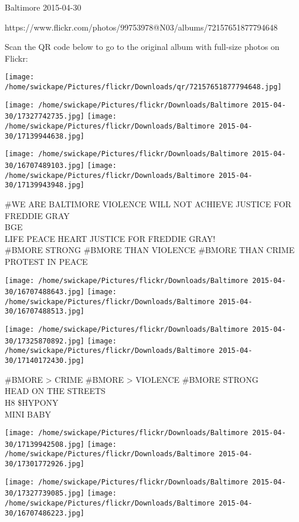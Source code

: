 \documentclass[10pt,letterpaper]{article}
\begin{document}
Baltimore 2015-04-30

https://www.flickr.com/photos/99753978@N03/albums/72157651877794648

Scan the QR code below to go to the original album with full-size photos on Flickr:

\texttt{[image: /home/swickape/Pictures/flickr/Downloads/qr/72157651877794648.jpg]}
\pagebreak

\texttt{[image: /home/swickape/Pictures/flickr/Downloads/Baltimore 2015-04-30/17327742735.jpg]}
\texttt{[image: /home/swickape/Pictures/flickr/Downloads/Baltimore 2015-04-30/17139944638.jpg]}

\texttt{[image: /home/swickape/Pictures/flickr/Downloads/Baltimore 2015-04-30/16707489103.jpg]}
\texttt{[image: /home/swickape/Pictures/flickr/Downloads/Baltimore 2015-04-30/17139943948.jpg]}

\#WE ARE BALTIMORE VIOLENCE WILL NOT ACHIEVE JUSTICE FOR FREDDIE GRAY\\
BGE\\
LIFE PEACE HEART JUSTICE FOR FREDDIE GRAY!\\
\#BMORE STRONG \#BMORE THAN VIOLENCE \#BMORE THAN CRIME PROTEST IN PEACE
\pagebreak

\texttt{[image: /home/swickape/Pictures/flickr/Downloads/Baltimore 2015-04-30/16707488643.jpg]}
\texttt{[image: /home/swickape/Pictures/flickr/Downloads/Baltimore 2015-04-30/16707488513.jpg]}

\texttt{[image: /home/swickape/Pictures/flickr/Downloads/Baltimore 2015-04-30/17325870892.jpg]}
\texttt{[image: /home/swickape/Pictures/flickr/Downloads/Baltimore 2015-04-30/17140172430.jpg]}

\#BMORE > CRIME \#BMORE > VIOLENCE \#BMORE STRONG\\
HEAD ON THE STREETS\\
H8 \$HYPONY\\
MINI BABY
\pagebreak

\texttt{[image: /home/swickape/Pictures/flickr/Downloads/Baltimore 2015-04-30/17139942508.jpg]}
\texttt{[image: /home/swickape/Pictures/flickr/Downloads/Baltimore 2015-04-30/17301772926.jpg]}

\texttt{[image: /home/swickape/Pictures/flickr/Downloads/Baltimore 2015-04-30/17327739085.jpg]}
\texttt{[image: /home/swickape/Pictures/flickr/Downloads/Baltimore 2015-04-30/16707486223.jpg]}
\end{document}
